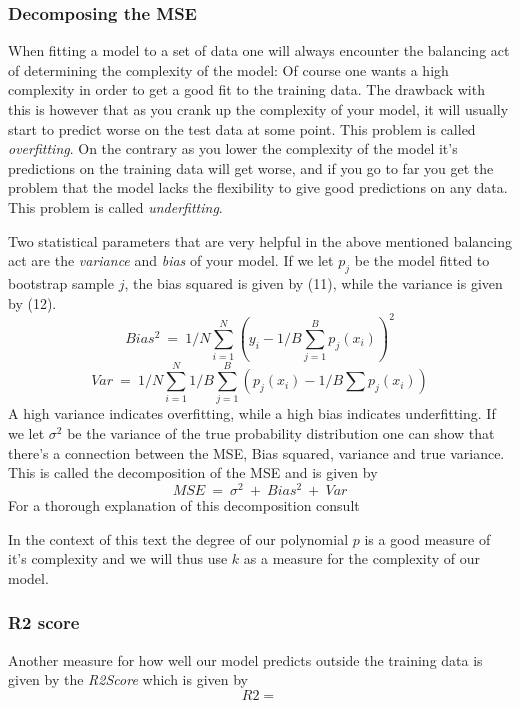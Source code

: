 \documentclass[a4paper,norsk]{article}
\begin{document}
\subsubsection{Decomposing the MSE}
When fitting a model to a set of data one will always encounter 
the balancing act of determining the complexity of the model: Of course
one wants a high complexity in order to get a good fit to the 
training data. The drawback with this is however that as you crank
up the complexity of your model, it will usually
start to predict worse on the test data at some point. 
This problem is called \textit{overfitting}. 
On the contrary as you lower the complexity of the model it's predictions
on the training data will get worse, and if you go to far you get the 
problem that the model lacks the flexibility to give good predictions on 
any data. This problem is called \textit{underfitting}.
\par
Two statistical parameters that are very helpful in the above mentioned 
balancing act are the \textit{variance} and \textit{bias} of your model. 
If we let $p_j$ be the model fitted to bootstrap sample $j$, 
the bias squared is given by (11), while the variance is given by (12).
\begin{equation}
    Bias^2 \ = \ 1/N \sum_{i=1}^N (y_i - 1/B \sum_{j=1}^B p_j(x_i))^2
\end{equation}
\begin{equation}
    Var \ = \ 1/N \sum_{i=1}^N 1/B \sum_{j=1}^B (p_j(x_i) 
    - 1/B \sum p_j(x_i))
\end{equation}
A high variance indicates overfitting, while a high bias indicates
underfitting. If we let $\sigma^2$ be the variance of the true probability
distribution one can show that there's a connection between the MSE,
Bias squared, variance and true variance. This is called the decomposition
of the MSE and is given by
\begin{equation}
    MSE \ = \ \sigma^2 \ + \ Bias^2 \ + \ Var
\end{equation}
For a thorough explanation of this decomposition consult \cite{hastie}
\par
In the context of this text the degree of our polynomial $p$ 
is a good measure of it's complexity and we will thus use 
$k$ as a measure for the complexity of our model.

\subsubsection{R2 score}
Another measure for how well our model predicts outside the training data 
is given by the \textit{R2Score} which is given by
\begin{equation}
    R2 = 
\end{equation}
\end{document}
